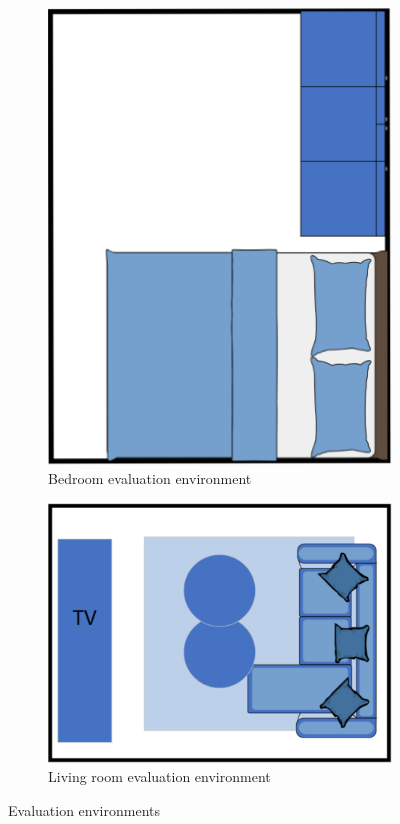 \begin{figure}[H]
\begin{subfigure}{0.35\textwidth}
        \includegraphics[width=\linewidth]{figures/Liveroom2.png}
        \caption{Bedroom evaluation environment}
        \label{fig:Liveroom2}
    \end{subfigure}
    \hfill
    \begin{subfigure}{0.45\textwidth}
        \centering
        \includegraphics[width=\linewidth]{figures/Liveroom3.png}
        \caption{Living room evaluation environment}
        \label{fig:Liveroom3}
    \end{subfigure}
    
    \caption{Evaluation environments}
    \label{fig:Liveroom}
\end{figure}


